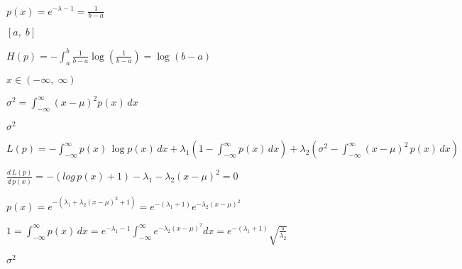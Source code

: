 \documentclass{article}
\def\lthtmlcheckvsize{\ifdim\ht\sizebox<\vsize 
  \ifdim\wd\sizebox<\hsize\expandafter\hfill\fi \expandafter\vfill
  \else\expandafter\vss\fi}%
\begin{document}
{\newpage\clearpage
{}%
$\displaystyle p(x)=e^{-\lambda-1}=\frac{1}{b-a}$%
\lthtmlindisplaymathZ
\lthtmlcheckvsize\clearpage}

{\newpage\clearpage
{}%
$ [a,\;b]$%
\lthtmlindisplaymathZ
\lthtmlcheckvsize\clearpage}

{\newpage\clearpage
{}%
$\displaystyle H(p)=-\int_a^b \frac{1}{b-a}\log \left(\frac{1}{b-a}\right)
=\log (b-a)$%
\lthtmlindisplaymathZ
\lthtmlcheckvsize\clearpage}

{\newpage\clearpage
{}%
$ x\in (-\infty,\;\infty)$%
\lthtmlindisplaymathZ
\lthtmlcheckvsize\clearpage}

{\newpage\clearpage
{}%
$\displaystyle \sigma^2=\int^\infty_{-\infty} (x-\mu)^2p(x)\,dx$%
\lthtmlindisplaymathZ
\lthtmlcheckvsize\clearpage}

{\newpage\clearpage
{}%
$ \sigma^2$%
\lthtmlindisplaymathZ
\lthtmlcheckvsize\clearpage}

{\newpage\clearpage
{}%
$\displaystyle L(p)=-\int^\infty_{-\infty} p(x)\,\log p(x)\,dx
+\lambda_1\left(1-\int^\infty_{-\infty} p(x)\,dx\right)
+\lambda_2\left(\sigma^2 -\int^\infty_{-\infty} (x-\mu)^2\,p(x)\,dx\right)$%
\lthtmlindisplaymathZ
\lthtmlcheckvsize\clearpage}

{\newpage\clearpage
{}%
$\displaystyle \frac{d\, L(p)}{d\,p(x)}=- (log\,p(x)+1)-\lambda_1-\lambda_2(x-\mu)^2=0$%
\lthtmlindisplaymathZ
\lthtmlcheckvsize\clearpage}

{\newpage\clearpage
{}%
$\displaystyle p(x)=e^{-(\lambda_1+\lambda_2(x-\mu)^2+1)}
=e^{-(\lambda_1+1)} e^{-\lambda_2(x-\mu)^2}$%
\lthtmlindisplaymathZ
\lthtmlcheckvsize\clearpage}

{\newpage\clearpage
{}%
$\displaystyle 1 = \int^\infty_{-\infty} p(x)\,dx=e^{-\lambda_1-1}\int^\infty_{-\infty} e^{-\lambda_2(x-\mu)^2}dx
=e^{-(\lambda_1+1)}\sqrt{\frac{\pi}{\lambda_2}}$%
\lthtmlindisplaymathZ
\lthtmlcheckvsize\clearpage}

{\newpage\clearpage
{}%
$\displaystyle \sigma^2$%
\lthtmlindisplaymathZ
\lthtmlcheckvsize\clearpage}
\end{document}
